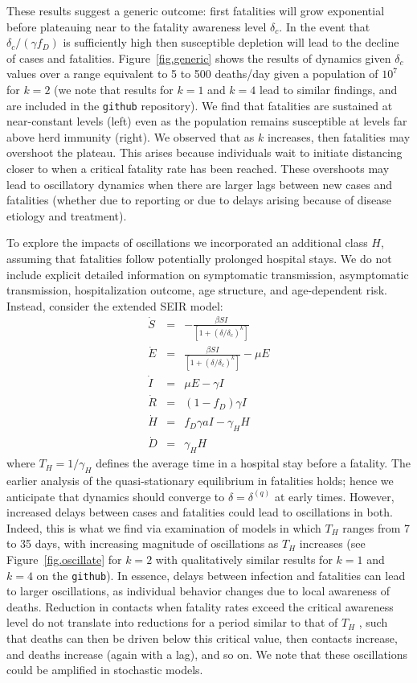 These results suggest a generic outcome: first fatalities will grow
exponential before plateauing near to the fatality awareness level $\delta_c$.
In the event that $\delta_c/(\gamma f_D)$ is sufficiently high then susceptible
depletion will lead to the decline of cases and fatalities.
Figure~\ref{fig.generic} shows
the results of dynamics given $\delta_c$ values over a range 
equivalent to 5 to 500 deaths/day given a population of $10^7$
for $k=2$ (we note that results for $k=1$ and $k=4$ lead to similar
findings, and are included in the \verb|github| repository).
We find that fatalities are sustained at near-constant levels (left)
even as the population remains susceptible at levels far above herd immunity (right).
We observed that as $k$ increases, then fatalities may overshoot
the plateau. This arises because individuals wait to initiate distancing
closer to when a critical fatality rate has been reached.
These overshoots may lead to oscillatory dynamics
when there are larger lags between new cases and fatalities
(whether due to reporting or due to delays arising because of disease
etiology and treatment).

To explore the impacts of oscillations
we incorporated an additional class $H$,
assuming that fatalities follow potentially prolonged
hospital stays.  We do not include explicit
detailed information on symptomatic transmission, asymptomatic
transmission, hospitalization outcome,
age structure, and age-dependent risk. Instead, 
consider the extended SEIR model:
\begin{eqnarray}
\dot{S} &=& -\frac{\beta SI}{\left[1+\left(\delta/\delta_c\right)^{k}\right]}\\
\dot{E} &=& \frac{\beta SI}{\left[1+\left(\delta/\delta_c\right)^{k}\right]}-\mu E\\
\dot{I} &=& \mu E-\gamma I \\
\dot{R} &=& (1-f_D)\gamma I\\
\dot{H} &=& f_D\gamma a I - \gamma_H H\\
\dot{D} &=& \gamma_H H
\end{eqnarray}
where $T_H=1/\gamma_H$ defines the average time in a hospital
stay before a fatality. The earlier analysis of
the quasi-stationary equilibrium in fatalities holds; hence
we anticipate that dynamics should converge to $\delta=\delta^{(q)}$
at early times. However, increased delays between cases and
fatalities could lead to oscillations in both.  Indeed, this
is what we find via examination of models in which
$T_H$ ranges from 7 to 35 days, with increasing magnitude of
oscillations as $T_H$ increases (see Figure~\ref{fig.oscillate} 
for $k=2$ with qualitatively similar results for $k=1$ and
$k=4$ on the \verb|github|).
In essence, delays between infection and fatalities can lead to larger oscillations,
as individual behavior changes due to local awareness of deaths.  Reduction in 
contacts when fatality rates exceed the critical awareness level do not translate
into reductions for a period similar to that of $T_H$ , such that deaths can then be driven
below this critical value, then contacts increase, and deaths increase (again with
a lag), and so on.  
We note that these oscillations could be amplified 
in stochastic models.  

